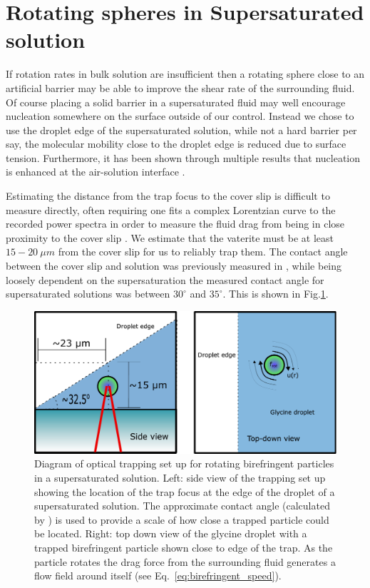 \section{Rotating spheres in Supersaturated solution}
If rotation rates in bulk solution are insufficient then a 
rotating sphere close to an artificial barrier may be able 
to improve the shear rate of the surrounding fluid. Of course 
placing a solid barrier in a supersaturated fluid may well 
encourage nucleation somewhere on the surface outside of our 
control. Instead we chose to use the droplet edge of the 
supersaturated solution, while not a hard barrier per say, 
the molecular mobility close to the droplet edge is reduced 
due to surface tension. Furthermore, it has been shown through 
multiple results that nucleation is enhanced at the air-solution 
interface \cite{Liao2022,Yuyama2010, Sugiyama2009}. 

Estimating the distance from the trap focus to the cover slip
is difficult to measure directly, often requiring one fits a 
complex Lorentzian curve to the recorded power spectra in order 
to measure the fluid drag from being in close proximity to the 
cover slip \cite{BergSoerensen2004}. We estimate that the 
vaterite must be at least $15-20\ \mu m$ from the cover slip for 
us to reliably trap them. The contact angle between the cover 
slip and solution was previously measured in \cite{Flannigan2023},
while being loosely dependent on the supersaturation the 
measured contact angle for supersaturated solutions was between 
$30^{\circ}$ and $35^{\circ}$. This is shown in Fig.\ref{fig:3.9}.
\begin{figure}[h!]
	\centering
	\includegraphics[width=\linewidth]{vaterite_diagram.pdf}
	\caption{Diagram of optical trapping set up for rotating 
		birefringent particles in a supersaturated solution. 
		Left: side view of the trapping set up showing the 
		location of the trap focus at the edge of the droplet 
		of a supersaturated solution. The approximate contact 
		angle (calculated by \cite{Flannigan2023}) is used to 
		provide a scale of how close a trapped particle could 
		be located. Right: top down view of the glycine droplet 
		with a trapped birefringent particle shown close to 
		edge of the trap. As the particle rotates the drag 
		force from the surrounding fluid generates a flow field 
		around itself (see Eq.~\ref{eq:birefringent_speed}).}
	\label{fig:3.9}
\end{figure}

